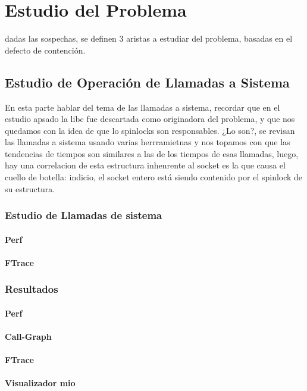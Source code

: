 \chapter{Estudio del Problema}

dadas las sospechas, se definen 3 aristas a estudiar del problema, basadas en el defecto de contención.

\section{Estudio de Operación de Llamadas a Sistema}
En esta parte hablar del tema de las llamadas a sistema, recordar que en el estudio apsado la libc fue descartada como originadora del problema, y que nos quedamos con la idea de que lo spinlocks son responsables. ¿Lo son?, se revisan las llamadas a sistema usando varias herrramietnas y nos topamos con que las tendencias de tiempos son similares a las de los tiempos de esas llamadas, luego, hay una correlacion de esta estructura inhenrente al socket es la que causa el cuello de botella: indicio, el socket entero está siendo contenido por el spinlock de su estructura.
\subsection{Estudio de Llamadas de sistema}
\subsubsection{Perf}
\subsubsection{FTrace}
\subsection{Resultados}
\subsubsection{Perf}
\subsubsection{Call-Graph}
\subsubsection{FTrace}
\subsubsection{Visualizador mio}
